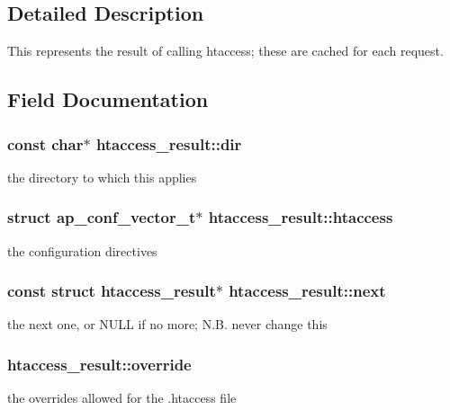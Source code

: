 \subsection{Detailed Description}
This represents the result of calling htaccess; these are cached for each request. 

\subsection{Field Documentation}
\subsubsection[{\texorpdfstring{dir}{dir}}]{\setlength{\rightskip}{0pt plus 5cm}const char$\ast$ htaccess\+\_\+result\+::dir}\hypertarget{structhtaccess__result_a44cbad360a6b07466a9bb074a5c31c10}{}\label{structhtaccess__result_a44cbad360a6b07466a9bb074a5c31c10}
the directory to which this applies 
\subsubsection[{\texorpdfstring{htaccess}{htaccess}}]{\setlength{\rightskip}{0pt plus 5cm}struct {\bf ap\+\_\+conf\+\_\+vector\+\_\+t}$\ast$ htaccess\+\_\+result\+::htaccess}\hypertarget{structhtaccess__result_ac582918fea5f8a8665de0d7677e2e8e5}{}\label{structhtaccess__result_ac582918fea5f8a8665de0d7677e2e8e5}
the configuration directives 
\subsubsection[{\texorpdfstring{next}{next}}]{\setlength{\rightskip}{0pt plus 5cm}const struct {\bf htaccess\+\_\+result}$\ast$ htaccess\+\_\+result\+::next}\hypertarget{structhtaccess__result_ad7f156c7008865fc065eb6c3c27084f7}{}\label{structhtaccess__result_ad7f156c7008865fc065eb6c3c27084f7}
the next one, or N\+U\+LL if no more; N.\+B. never change this 
\subsubsection[{\texorpdfstring{override}{override}}]{ htaccess\+\_\+result\+::override}\hypertarget{structhtaccess__result_a7e24a89c3770b6c9096ff8b171687aa1}{}\label{structhtaccess__result_a7e24a89c3770b6c9096ff8b171687aa1}
the overrides allowed for the .htaccess file 
